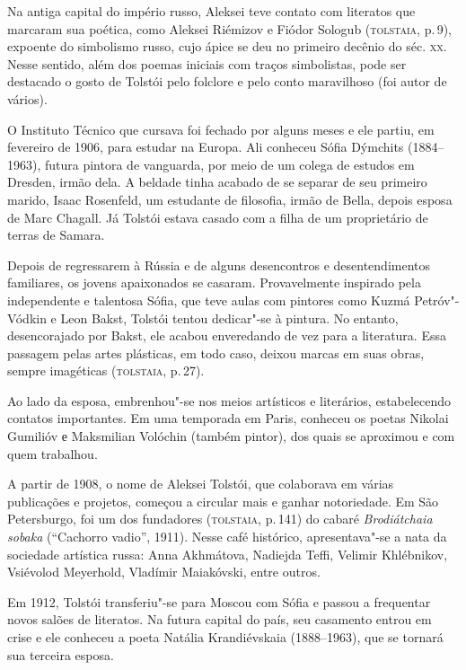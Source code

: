 Na antiga capital do império russo, Aleksei teve contato com literatos
que marcaram sua poética, como Aleksei Riémizov e Fiódor Sologub
(\textsc{tolstaia}, p.\,9), expoente do simbolismo russo, cujo ápice se deu no
primeiro decênio do séc. \textsc{xx}. Nesse sentido, além dos poemas iniciais com
traços simbolistas, pode ser destacado o gosto de Tolstói pelo
folclore e pelo conto maravilhoso (foi autor de vários).

O Instituto Técnico que cursava foi fechado por alguns meses e ele
partiu, em fevereiro de 1906, para estudar na Europa. Ali conheceu Sófia
Dýmchits (1884--1963), futura pintora de vanguarda, por meio de um colega
de estudos em Dresden, irmão dela. A beldade tinha acabado de se separar
de seu primeiro marido, Isaac Rosenfeld, um estudante de filosofia,
irmão de Bella, depois esposa de Marc Chagall. Já Tolstói estava casado
com a filha de um proprietário de terras de Samara.

Depois de regressarem à Rússia e de alguns desencontros e
desentendimentos familiares, os jovens apaixonados se casaram.
Provavelmente inspirado pela independente e talentosa Sófia, que teve
aulas com pintores como Kuzmá Petróv"-Vódkin e Leon Bakst, Tolstói tentou dedicar"-se à pintura. No entanto, desencorajado por Bakst, ele
acabou enveredando de vez para a literatura. Essa passagem pelas artes
plásticas, em todo caso, deixou marcas em suas obras, sempre imagéticas
(\textsc{tolstaia}, p.\,27).

Ao lado da esposa, embrenhou"-se nos meios artísticos e literários,
estabelecendo contatos importantes. Em uma temporada em Paris, conheceu
os poetas Nikolai Gumilióv е Maksmilian Volóchin (também pintor), dos
quais se aproximou e com quem trabalhou.

A partir de 1908, o nome de Aleksei Tolstói, que colaborava em várias
publicações e projetos, começou a circular mais e ganhar notoriedade. Em
São Petersburgo, foi um dos fundadores (\textsc{tolstaia}, p.\,141) do cabaré
\emph{Brodiátchaia sobaka} (``Cachorro vadio'', 1911). Nesse café
histórico, apresentava"-se a nata da sociedade artística russa: Anna
Akhmátova, Nadiejda Teffi, Velimir Khlébnikov, Vsiévolod Meyerhold,
Vladímir Maiakóvski, entre outros.

Em 1912, Tolstói transferiu"-se para Moscou com Sófia e passou a
frequentar novos salões de literatos. Na futura capital do país, seu
casamento entrou em crise e ele conheceu a poeta Natália Krandiévskaia
(1888--1963), que se tornará sua terceira esposa.

